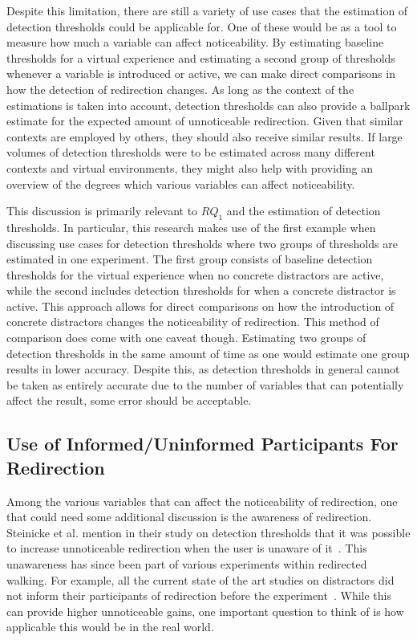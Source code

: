 Despite this limitation, there are still a variety of use cases that the estimation of detection thresholds could be applicable for. One of these would be as a tool to measure how much a variable can affect noticeability. By estimating baseline thresholds for a virtual experience and estimating a second group of thresholds whenever a variable is introduced or active, we can make direct comparisons in how the detection of redirection changes. As long as the context of the estimations is taken into account, detection thresholds can also provide a ballpark estimate for the expected amount of unnoticeable redirection. Given that similar contexts are employed by others, they should also receive similar results. If large volumes of detection thresholds were to be estimated across many different contexts and virtual environments, they might also help with providing an overview of the degrees which various variables can affect noticeability. 

This discussion is primarily relevant to $RQ_1$ and the estimation of detection thresholds. In particular, this research makes use of the first example when discussing use cases for detection thresholds where two groups of thresholds are estimated in one experiment. The first group consists of baseline detection thresholds for the virtual experience when no concrete distractors are active, while the second includes detection thresholds for when a concrete distractor is active. This approach allows for direct comparisons on how the introduction of concrete distractors changes the noticeability of redirection. This method of comparison does come with one caveat though. Estimating two groups of detection thresholds in the same amount of time as one would estimate one group results in lower accuracy. Despite this, as detection thresholds in general cannot be taken as entirely accurate due to the number of variables that can potentially affect the result, some error should be acceptable. 

\subsection{Use of Informed/Uninformed Participants For Redirection}
Among the various variables that can affect the noticeability of redirection, one that could need some additional discussion is the awareness of redirection. Steinicke et al. mention in their study on detection thresholds that it was possible to increase unnoticeable redirection when the user is unaware of it~\cite{5072212}. This unawareness has since been part of various experiments within redirected walking. For example, all the current state of the art studies on distractors did not inform their participants of redirection before the experiment~\cite{sra2018vmotion, chen2017towards, chen2017supporting}. While this can provide higher unnoticeable gains, one important question to think of is how applicable this would be in the real world. 

